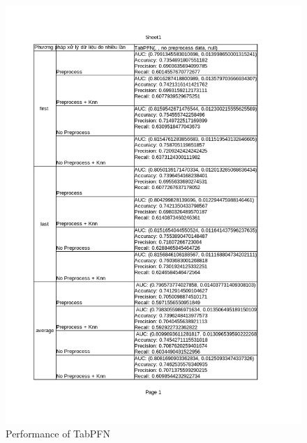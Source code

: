 \documentclass[../main.tex]{subfiles}
\begin{document}
 \begin{figure}[H]
    \centering
    \includegraphics[width=\textwidth]{Figure/KidneyResultNoLimit-new_TabPFN.png}
    \caption{Performance of TabPFN}
    \label{fig:KidneyResultNoLimit-new_TabPFN}
\end{figure}
\end{document}
